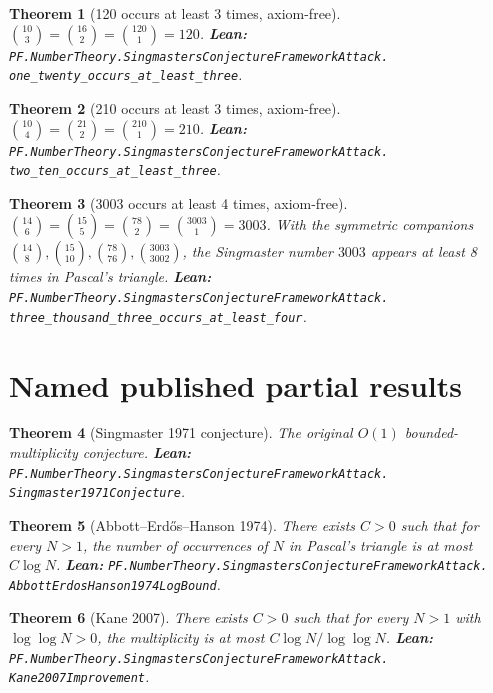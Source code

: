 \documentclass[11pt,a4paper]{article}
\theoremstyle{plain}
\newtheorem{theorem}{Theorem}[section]
\theoremstyle{definition}
\begin{document}
\begin{theorem}[120 occurs at least 3 times, axiom-free]
\label{thm:120}
$\binom{10}{3} = \binom{16}{2} = \binom{120}{1} = 120$.
\textbf{Lean:}
\texttt{PF.NumberTheory.SingmastersConjectureFrameworkAttack.\\
one\_twenty\_occurs\_at\_least\_three}.
\end{theorem}

\begin{theorem}[210 occurs at least 3 times, axiom-free]
\label{thm:210}
$\binom{10}{4} = \binom{21}{2} = \binom{210}{1} = 210$.
\textbf{Lean:}
\texttt{PF.NumberTheory.SingmastersConjectureFrameworkAttack.\\
two\_ten\_occurs\_at\_least\_three}.
\end{theorem}

\begin{theorem}[3003 occurs at least 4 times, axiom-free]
\label{thm:3003}
$\binom{14}{6} = \binom{15}{5} = \binom{78}{2} = \binom{3003}{1}
= 3003$. With the symmetric companions
$\binom{14}{8}, \binom{15}{10}, \binom{78}{76}, \binom{3003}{3002}$,
the Singmaster number $3003$ appears at least 8 times in Pascal's
triangle.
\textbf{Lean:}
\texttt{PF.NumberTheory.SingmastersConjectureFrameworkAttack.\\
three\_thousand\_three\_occurs\_at\_least\_four}.
\end{theorem}

\section{Named published partial results}

\begin{theorem}[Singmaster 1971 conjecture]
\label{thm:sing1971}
The original $O(1)$ bounded-multiplicity conjecture.
\textbf{Lean:}
\texttt{PF.NumberTheory.SingmastersConjectureFrameworkAttack.\\
Singmaster1971Conjecture}.
\end{theorem}

\begin{theorem}[Abbott--Erd\H{o}s--Hanson 1974]
\label{thm:aeh}
There exists $C > 0$ such that for every $N > 1$, the number of
occurrences of $N$ in Pascal's triangle is at most $C \log N$.
\textbf{Lean:}
\texttt{PF.NumberTheory.SingmastersConjectureFrameworkAttack.\\
AbbottErdosHanson1974LogBound}.
\end{theorem}

\begin{theorem}[Kane 2007]
\label{thm:kane}
There exists $C > 0$ such that for every $N > 1$ with
$\log \log N > 0$, the multiplicity is at most
$C \log N / \log \log N$.
\textbf{Lean:}
\texttt{PF.NumberTheory.SingmastersConjectureFrameworkAttack.\\
Kane2007Improvement}.
\end{theorem}
\end{document}
